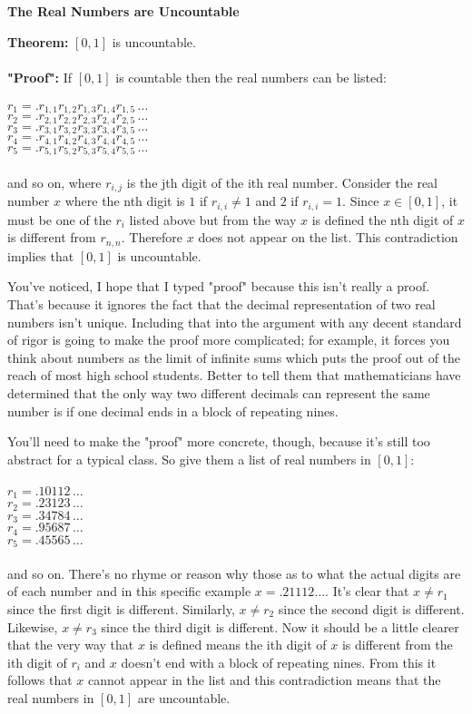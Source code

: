 \documentclass[12pt]{article}
\begin{document}
\begin{center}
\Large{\textbf{The Real Numbers are Uncountable}}
\end{center}
\textbf{Theorem:} $[0,1]$ is uncountable.\\\\
\textbf{"Proof":} If $[0,1]$ is countable then the 
real numbers can be listed:\\\\
$r_1=.r_{1,1}r_{1,2}r_{1,3}r_{1,4}r_{1,5}\,\ldots$\\
$r_2=.r_{2,1}r_{2,2}r_{2,3}r_{2,4}r_{2,5}\,\ldots$\\
$r_3=.r_{3,1}r_{3,2}r_{3,3}r_{3,4}r_{3,5}\,\ldots$\\
$r_4=.r_{4,1}r_{4,2}r_{4,3}r_{4,4}r_{4,5}\,\ldots$\\
$r_5=.r_{5,1}r_{5,2}r_{5,3}r_{5,4}r_{5,5}\,\ldots$\\\\
and so on, where $r_{i,j}$ is the jth digit of the ith real 
number. Consider the real number $x$ where the nth digit 
is $1$ if  $r_{i,i} \neq 1$ and $2$ if $r_{i,i} = 1$.
Since $x \in [0,1]$, it must be one of the $r_i$ listed above 
but from the way $x$ is defined the nth digit of $x$ is 
different from $r_{n,n}$. Therefore $x$ does not appear on 
the list. This contradiction implies that $[0,1]$ is 
uncountable.

You've noticed, I hope that I typed "proof" because this 
isn't really a proof. That's because it ignores the fact that the 
decimal representation of two real numbers isn't unique. 
Including that into the argument with any decent standard 
of rigor is going to make the proof more complicated; 
for example, it forces you think about numbers as the limit 
of infinite sums which puts the proof out of the reach of most 
high school students. Better to tell them that 
mathematicians have determined that the only way 
two different decimals can represent the same number is
if one decimal ends in a block of repeating nines. 

You'll need to make the "proof" more concrete, though, 
because it's still too abstract for a typical class.
So give them a list of real numbers in $[0,1]$:\\\\
$r_1=.10112\,\ldots$\\
$r_2=.23123\,\ldots$\\
$r_3=.34784\,\ldots$\\
$r_4=.95687\,\ldots$\\
$r_5=.45565\,\ldots$\\\\
and so on. There's no rhyme or reason why those as to 
what the actual digits are of each number and in this 
specific example $x=.21112\ldots$. It's clear that
$x \neq r_1$ since the first digit is different. Similarly, 
$x \neq r_2$ since the second digit is different. Likewise, 
$x \neq r_3$ since the third digit is different. Now it should
be a little clearer that the very way that $x$ is defined 
means the ith digit of $x$ is different from the ith digit 
of $r_i$ and $x$ doesn't end with a block of repeating nines.
From this it follows that $x$ cannot appear in the list and 
this contradiction means that the real numbers 
in $[0,1]$ are uncountable.
\end{document}
